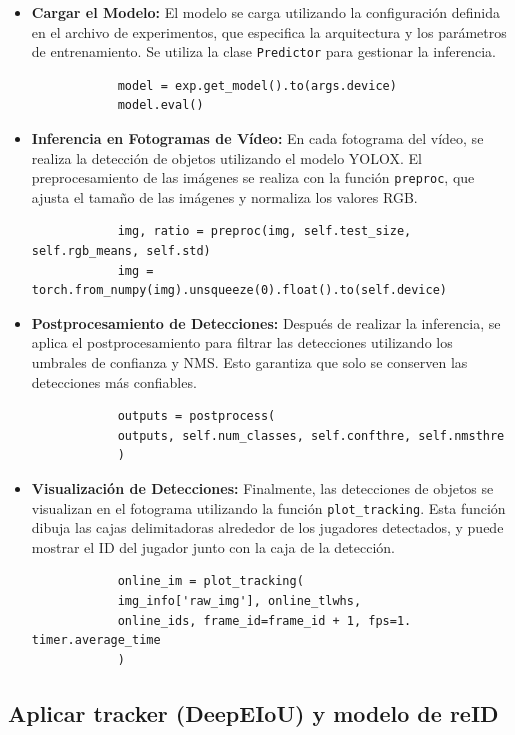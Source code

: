 \documentclass[12pt, a4paper, twoside]{article}
\begin{document}
	\begin{itemize}
		\item \textbf{Cargar el Modelo:} El modelo se carga utilizando la configuración definida en el archivo de experimentos, que especifica la arquitectura y los parámetros de entrenamiento. Se utiliza la clase \texttt{Predictor} para gestionar la inferencia.
		\begin{verbatim}
			model = exp.get_model().to(args.device)
			model.eval()
		\end{verbatim}
		
		\item \textbf{Inferencia en Fotogramas de Vídeo:} En cada fotograma del vídeo, se realiza la detección de objetos utilizando el modelo YOLOX. El preprocesamiento de las imágenes se realiza con la función \texttt{preproc}, que ajusta el tamaño de las imágenes y normaliza los valores RGB.
		\begin{verbatim}
			img, ratio = preproc(img, self.test_size, self.rgb_means, self.std)
			img = torch.from_numpy(img).unsqueeze(0).float().to(self.device)
		\end{verbatim}
		
		\item \textbf{Postprocesamiento de Detecciones:} Después de realizar la inferencia, se aplica el postprocesamiento para filtrar las detecciones utilizando los umbrales de confianza y NMS. Esto garantiza que solo se conserven las detecciones más confiables.
		\begin{verbatim}
			outputs = postprocess(
			outputs, self.num_classes, self.confthre, self.nmsthre
			)
		\end{verbatim}
		
		\item \textbf{Visualización de Detecciones:} Finalmente, las detecciones de objetos se visualizan en el fotograma utilizando la función \texttt{plot\_tracking}. Esta función dibuja las cajas delimitadoras alrededor de los jugadores detectados, y puede mostrar el ID del jugador junto con la caja de la detección.
		\begin{verbatim}
			online_im = plot_tracking(
			img_info['raw_img'], online_tlwhs, 
			online_ids, frame_id=frame_id + 1, fps=1. timer.average_time
			)
		\end{verbatim}
	\end{itemize}
	
	
	
	
	\subsection{Aplicar tracker (DeepEIoU) y modelo de reID}
	
\end{document}

